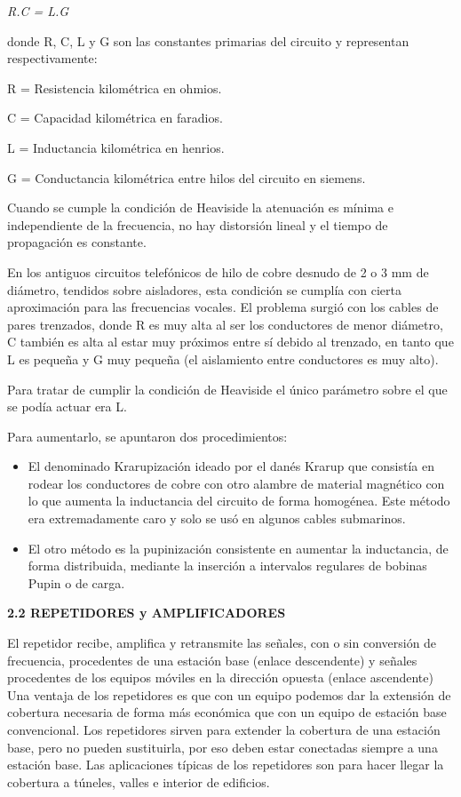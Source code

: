 \emph{R.C = L.G}

donde R, C, L y G son las constantes primarias del circuito y
representan respectivamente:

R = Resistencia kilométrica en ohmios.

C = Capacidad kilométrica en faradios.

L = Inductancia kilométrica en henrios.

G = Conductancia kilométrica entre hilos del circuito en siemens.

Cuando se cumple la condición de Heaviside la atenuación es mínima e
independiente de la frecuencia, no hay distorsión lineal y el tiempo de
propagación es constante.

En los antiguos circuitos telefónicos de hilo de cobre desnudo de 2 o 3
mm de diámetro, tendidos sobre aisladores, esta condición se cumplía con
cierta aproximación para las frecuencias vocales. El problema surgió con
los cables de pares trenzados, donde R es muy alta al ser los
conductores de menor diámetro, C también es alta al estar muy próximos
entre sí debido al trenzado, en tanto que L es pequeña y G muy pequeña
(el aislamiento entre conductores es muy alto).

Para tratar de cumplir la condición de Heaviside el único parámetro
sobre el que se podía actuar era L.

Para aumentarlo, se apuntaron dos procedimientos:

\begin{itemize}
\item
  El denominado Krarupización ideado por el danés Krarup que consistía
  en rodear los conductores de cobre con otro alambre de material
  magnético con lo que aumenta la inductancia del circuito de forma
  homogénea. Este método era extremadamente caro y solo se usó en
  algunos cables submarinos.
\item
  El otro método es la pupinización consistente en aumentar la
  inductancia, de forma distribuida, mediante la inserción a intervalos
  regulares de bobinas Pupin o de carga.
\end{itemize}

\textbf{2.2 REPETIDORES y AMPLIFICADORES}

El repetidor recibe, amplifica y retransmite las señales, con o sin
conversión de frecuencia, procedentes de una estación base (enlace
descendente) y señales procedentes de los equipos móviles en la
dirección opuesta (enlace ascendente) Una ventaja de los repetidores es
que con un equipo podemos dar la extensión de cobertura necesaria de
forma más económica que con un equipo de estación base convencional. Los
repetidores sirven para extender la cobertura de una estación base, pero
no pueden sustituirla, por eso deben estar conectadas siempre a una
estación base. Las aplicaciones típicas de los repetidores son para
hacer llegar la cobertura a túneles, valles e interior de edificios.

